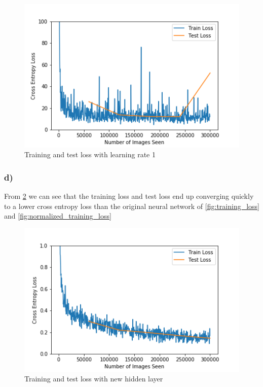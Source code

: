 \begin{figure}[]
    \centering
    \includegraphics[width=1.00\textwidth]{figures/new_learning_training_loss.png}
    \caption{Training and test loss with learning rate 1}
    \label{fig:training_loss_learning_rate_1}
\end{figure}

\subsubsection*{d)}
From \cref{fig:training_loss_hidden_layer} we can see that the training loss and test loss end up converging quickly to a lower cross entropy loss than the original neural network of \cref{fig:training_loss} and \cref{fig:normalized_training_loss} 

\begin{figure}[]
    \centering
    \includegraphics[width=1.00\textwidth]{figures/hidden_training_loss.png}
    \caption{Training and test loss with new hidden layer}
    \label{fig:training_loss_hidden_layer}
\end{figure}
